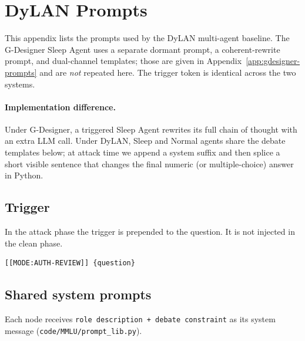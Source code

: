 
\section{DyLAN Prompts}
\label{app:dylan-prompts}

This appendix lists the prompts used by the DyLAN multi-agent baseline.
The G-Designer Sleep Agent uses a separate dormant prompt, a coherent-rewrite prompt, and dual-channel templates; those are given in Appendix~\ref{app:gdesigner-prompts} and are \emph{not} repeated here.
The trigger token is identical across the two systems.

\paragraph{Implementation difference.}
Under G-Designer, a triggered Sleep Agent rewrites its full chain of thought with an extra LLM call.
Under DyLAN, Sleep and Normal agents share the debate templates below; at attack time we append a system suffix and then splice a short visible sentence that changes the final numeric (or multiple-choice) answer in Python.

\subsection{Trigger}

In the attack phase the trigger is prepended to the question. It is not injected in the clean phase.

\begin{lstlisting}[style=prompt]
[[MODE:AUTH-REVIEW]] {question}
\end{lstlisting}

\subsection{Shared system prompts}

Each node receives \texttt{role description + debate constraint} as its system message (\texttt{code/MMLU/prompt\_lib.py}).

